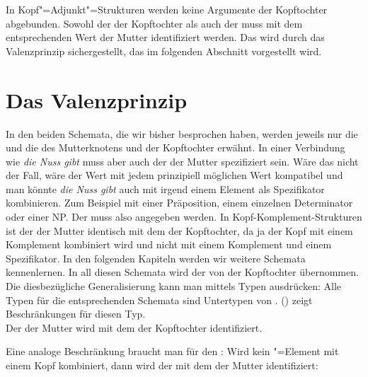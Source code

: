 In Kopf"=Adjunkt"=Strukturen werden keine Argumente der Kopftochter abgebunden. Sowohl der \sprw der
Kopftochter als auch der \compsw muss mit dem entsprechenden Wert der Mutter identifiziert
werden. Das wird durch das Valenzprinzip sichergestellt, das im folgenden Abschnitt vorgestellt wird.

\section{Das Valenzprinzip}
\label{Abschnitt-Valenzprinzip}

In den beiden Schemata, die wir bisher besprochen haben, werden jeweils nur die \sprwe und die
\compswe des Mutterknotens und der Kopftochter erwähnt. In einer Verbindung wie \emph{die Nuss gibt}
muss aber auch der \sprw der Mutter spezifiziert sein. Wäre das nicht der Fall, wäre der Wert mit
jedem prinzipiell möglichen Wert kompatibel und man könnte \emph{die Nuss gibt} auch mit irgend
einem Element als Spezifikator kombinieren. Zum Beispiel mit einer Präposition, einem einzelnen Determinator oder einer NP. Der
\sprw muss also angegeben werden. In Kopf-Komplement-Strukturen ist der \sprw der Mutter identisch
mit dem \sprw der Kopftochter, da ja der Kopf mit einem Komplement kombiniert wird und nicht mit
einem Komplement und einem Spezifikator. In den folgenden Kapiteln werden wir weitere Schemata
kennenlernen. In all diesen Schemata wird der \sprw von der Kopftochter übernommen. Die
diesbezügliche Generalisierung kann man mittels Typen ausdrücken: Alle Typen für die entsprechenden
Schemata sind Untertypen von . () zeigt Beschränkungen für
diesen Typ.
\ea
\label{type-head-non-specifier-phrase}
 \impl\\
\z
Der \sprw der Mutter wird mit dem der Kopftochter identifiziert.

Eine analoge Beschränkung braucht man für den \compsw: Wird kein \comps"=Element mit
einem Kopf kombiniert, dann wird der \compsw mit dem der Mutter identifiziert:
\ea
\label{type-head-non-complement-phrase}
 \impl\\
\z

